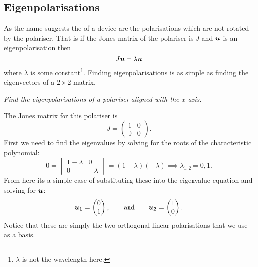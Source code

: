     \subsection{Eigenpolarisations}
    As the name suggests the  of a device are the polarisations which are not rotated by the polariser.
    That is if the Jones matrix of the polariser is \(J\) and \(\bm{u}\) is an eigenpolarisation then
    \[J\bm{u} = \lambda\bm{u}\]
    where \(\lambda\) is some constant\footnote{\(\lambda\) is not the wavelength here.}.
    Finding eigenpolarisations is as simple as finding the eigenvectors of a \(2\times 2\) matrix.
    \begin{example}
        \textit{Find the eigenpolarisations of a polariser aligned with the \(x\)-axis.}
        
        The Jones matrix for this polariser is
        \[
            J =
            \begin{pmatrix}
                1 & 0\\
                0 & 0
            \end{pmatrix}
            .
        \]
        First we need to find the eigenvalues by solving for the roots of the characteristic polynomial:
        \[
            0 = 
            \begin{vmatrix}
                1 - \lambda & 0\\
                0 & -\lambda
            \end{vmatrix}
            = (1 - \lambda)(-\lambda) \implies \lambda_{1, 2} = 0, 1.
        \]
        From here its a simple case of substituting these into the eigenvalue equation and solving for \(\bm{u}\):
        \[
            \bm{u_1} = 
            \begin{pmatrix}
                0\\ 1
            \end{pmatrix}
            ,\qquad\text{and}\qquad \bm{u_2} =
            \begin{pmatrix}
                1\\ 0
            \end{pmatrix}
            .
        \]
        Notice that these are simply the two orthogonal linear polarisations that we use as a basis.
    \end{example}
